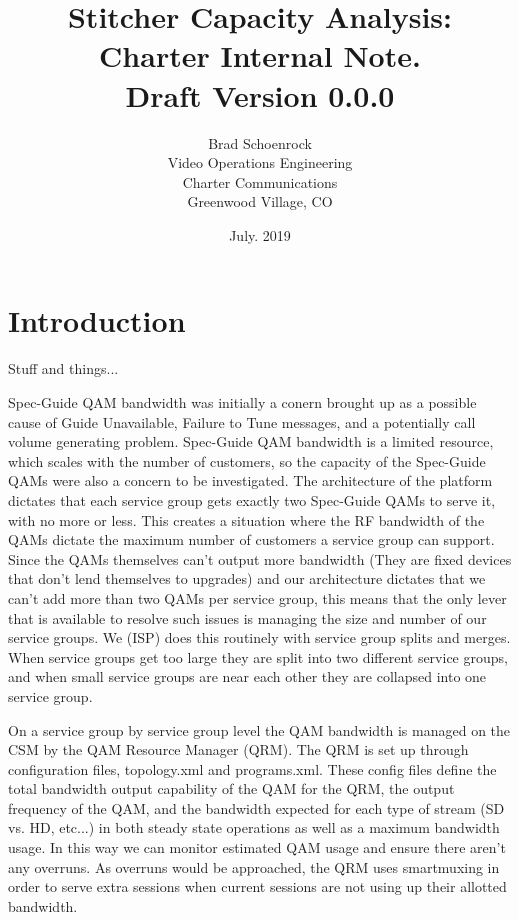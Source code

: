 \documentclass{article}
\author{Brad Schoenrock\\Video Operations Engineering\\Charter Communications\\Greenwood Village, CO}
\title{Stitcher Capacity Analysis:\\Charter Internal Note.\\Draft Version 0.0.0}
\date{July. 2019}
\begin{document}
\maketitle
\newpage

\tableofcontents
\newpage

\section{Introduction}
\label{SECTION-Introduction}

Stuff and things... 

Spec-Guide QAM bandwidth was initially a conern brought up as a possible cause of Guide Unavailable, Failure to Tune messages, and a potentially call volume generating problem. Spec-Guide QAM bandwidth is a limited resource, which scales with the number of customers, so the capacity of the Spec-Guide QAMs were also a concern to be investigated. The architecture of the platform dictates that each service group gets exactly two Spec-Guide QAMs to serve it, with no more or less. This creates a situation where the RF bandwidth of the QAMs dictate the maximum number of customers a service group can support. Since the QAMs themselves can't output more bandwidth (They are fixed devices that don't lend themselves to upgrades) and our architecture dictates that we can't add more than two QAMs per service group, this means that the only lever that is available to resolve such issues is managing the size and number of our service groups. We (ISP) does this routinely with service group splits and merges. When service groups get too large they are split into two different service groups, and when small service groups are near each other they are collapsed into one service group. 

On a service group by service group level the QAM bandwidth is managed on the CSM by the QAM Resource Manager (QRM). The QRM is set up through configuration files, topology.xml and programs.xml. These config files define the total bandwidth output capability of the QAM for the QRM, the output frequency of the QAM, and the bandwidth expected for each type of stream (SD vs. HD, etc...) in both steady state operations as well as a maximum bandwidth usage. In this way we can monitor estimated QAM usage and ensure there aren't any overruns. As overruns would be approached, the QRM uses smartmuxing in order to serve extra sessions when current sessions are not using up their allotted bandwidth. 
\end{document}
